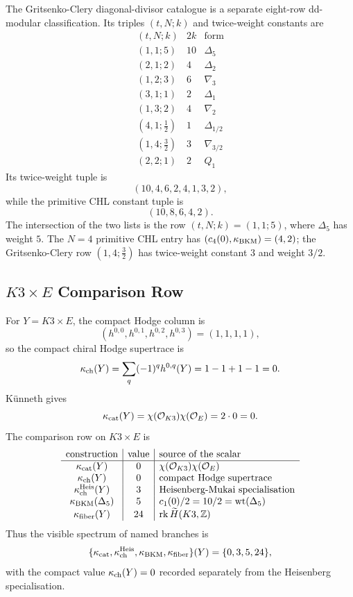 The Gritsenko-Clery diagonal-divisor catalogue is a separate
eight-row dd-modular classification.  Its triples \((t,N;k)\) and
twice-weight constants are
\[
\begin{array}{c|c|c}
(t,N;k) & 2k & \text{form}\\
\hline
(1,1;5) & 10 & \Delta_5\\
(2,1;2) & 4 & \Delta_2\\
(1,2;3) & 6 & \nabla_3\\
(3,1;1) & 2 & \Delta_1\\
(1,3;2) & 4 & \nabla_2\\
(4,1;\tfrac12) & 1 & \Delta_{1/2}\\
(1,4;\tfrac32) & 3 & \nabla_{3/2}\\
(2,2;1) & 2 & Q_1
\end{array}
\]
Its twice-weight tuple is
\[
  (10,4,6,2,4,1,3,2),
\]
while the primitive CHL constant tuple is
\[
  (10,8,6,4,2).
\]
The intersection of the two lists is the row \((t,N;k)=(1,1;5)\), where
\(\Delta_5\) has weight \(5\).  The \(N=4\) primitive CHL entry has
\((c_4(0),\kappa_{\mathrm{BKM}})=(4,2)\); the Gritsenko-Clery row \((1,4;\tfrac32)\)
has twice-weight constant \(3\) and weight \(3/2\).

\subsection*{\texorpdfstring{$K3\times E$}{K3 x E} Comparison Row}

For \(Y=K3\times E\), the compact Hodge column is
\[
  (h^{0,0},h^{0,1},h^{0,2},h^{0,3})=(1,1,1,1),
\]
so the compact chiral Hodge supertrace is
\[
  \kappa_{\mathrm{ch}}(Y)=\sum_q(-1)^qh^{0,q}(Y)=1-1+1-1=0.
\]
K\"unneth gives
\[
  \kappa_{\mathrm{cat}}(Y)=\chi(\mathcal O_{K3})\chi(\mathcal O_E)=2\cdot0=0.
\]
The comparison row on \(K3\times E\) is
\[
\begin{array}{c|c|l}
\text{construction} & \text{value} & \text{source of the scalar}\\
\hline
\kappa_{\mathrm{cat}}(Y) & 0 & \chi(\mathcal O_{K3})\chi(\mathcal O_E)\\
\kappa_{\mathrm{ch}}(Y) & 0 & \text{compact Hodge supertrace}\\
\kappa_{\mathrm{ch}}^{\mathrm{Heis}}(Y) & 3 & \text{Heisenberg-Mukai specialisation}\\
\kappa_{\mathrm{BKM}}(\Delta_5) & 5 & c_1(0)/2=10/2=\operatorname{wt}(\Delta_5)\\
\kappa_{\mathrm{fiber}}(Y) & 24 & \operatorname{rk}\widetilde H(K3,\mathbb{Z})
\end{array}
\]
Thus the visible spectrum of named branches is
\[
  \{\kappa_{\mathrm{cat}},\kappa_{\mathrm{ch}}^{\mathrm{Heis}},\kappa_{\mathrm{BKM}},\kappa_{\mathrm{fiber}}\}(Y)=\{0,3,5,24\},
\]
with the compact value \(\kappa_{\mathrm{ch}}(Y)=0\) recorded separately from the
Heisenberg specialisation.

